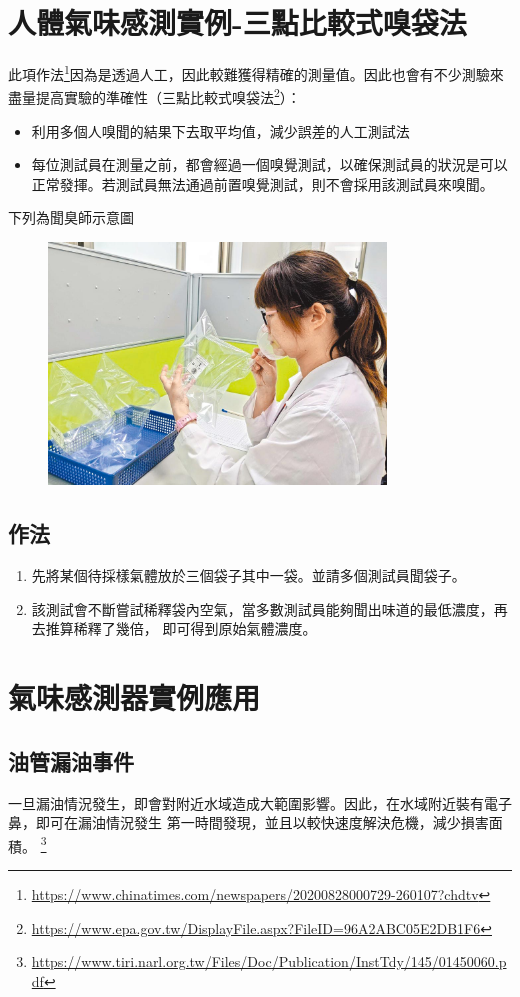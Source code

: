 \section{人體氣味感測實例-三點比較式嗅袋法}
此項作法\footnote{\url{https://www.chinatimes.com/newspapers/20200828000729-260107?chdtv}}因為是透過人工，因此較難獲得精確的測量值。因此也會有不少測驗來盡量提高實驗的準確性（三點比較式嗅袋法\footnote{\url{https://www.epa.gov.tw/DisplayFile.aspx?FileID=96A2ABC05E2DB1F6}}）：
	\begin{itemize}
		\item 利用多個人嗅聞的結果下去取平均值，減少誤差的人工測試法
		\item 每位測試員在測量之前，都會經過一個嗅覺測試，以確保測試員的狀況是可以正常發揮。若測試員無法通過前置嗅覺測試，則不會採用該測試員來嗅聞。
	\end{itemize}	
下列為聞臭師示意圖
	\begin{figure}[H]
		\centering
		\includegraphics[width=0.8\textwidth]{pic/smell_worker.jpg}
	\end{figure}
\subsection{作法}
	\begin{enumerate}
		\item 先將某個待採樣氣體放於三個袋子其中一袋。並請多個測試員聞袋子。
		\item 該測試會不斷嘗試稀釋袋內空氣，當多數測試員能夠聞出味道的最低濃度，再去推算稀釋了幾倍，
			即可得到原始氣體濃度。
	\end{enumerate}

\section{氣味感測器實例應用}
	\subsection{油管漏油事件}
	一旦漏油情況發生，即會對附近水域造成大範圍影響。因此，在水域附近裝有電子鼻，即可在漏油情況發生
	第一時間發現，並且以較快速度解決危機，減少損害面積。 \footnote{\url{https://www.tiri.narl.org.tw/Files/Doc/Publication/InstTdy/145/01450060.pdf}}